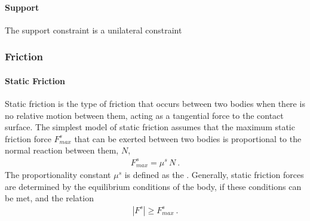 \documentclass[letterpaper,10pt,english]{jupyterBook}
\begin{document}
\paragraph{Support}
\label{\detokenize{ch/actions-reactions:support}}
\sphinxAtStartPar
The support constraint is a unilateral constraint  


\subsubsection{Friction}
\label{\detokenize{ch/actions-reactions:friction}}\label{\detokenize{ch/actions-reactions:classical-mechanics-actions-reactions-contact-friction}}

\paragraph{Static Friction}
\label{\detokenize{ch/actions-reactions:static-friction}}\label{\detokenize{ch/actions-reactions:classical-mechanics-actions-reactions-contact-friction-static}}
\sphinxAtStartPar
Static friction is the type of friction that occurs between two bodies when there is no relative motion between them, acting as a tangential force to the contact surface. The simplest model of static friction assumes that the maximum static friction force \(F^s_{max}\) that can be exerted between two bodies is proportional to the normal reaction between them, \(N\),
\begin{equation*}
\begin{split}F^s_{max} = \mu^s \, N \ .\end{split}
\end{equation*}
\sphinxAtStartPar
The proportionality constant \(\mu^s\) is defined as the . Generally, static friction forces are determined by the equilibrium conditions of the body, if these conditions can be met, and the relation
\begin{equation*}
\begin{split}|F^s| \ge F^s_{max} \ .\end{split}
\end{equation*}
\end{document}
